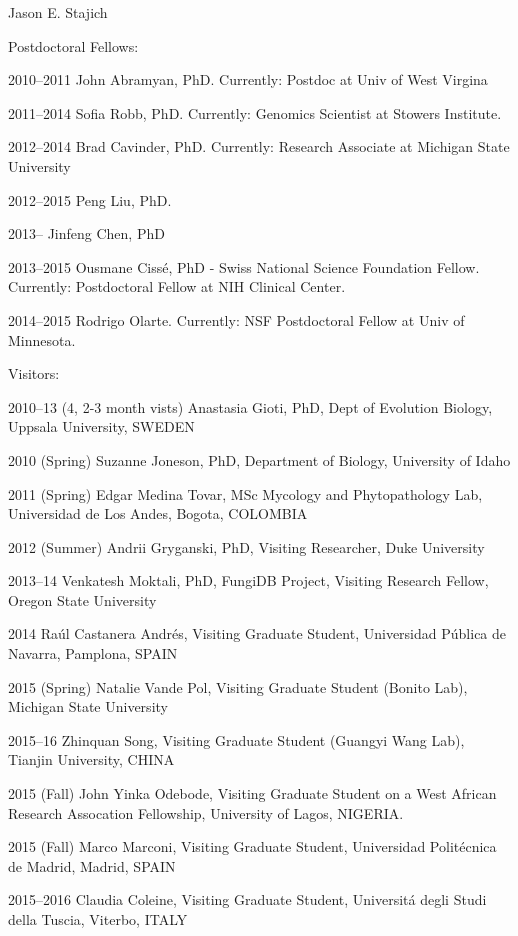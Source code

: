 \documentclass[10pt]{article}
\begin{document}
\begin{cv}{\centerline{Jason E. Stajich}}
\begin{cvlistcompact}{Postdoctoral Fellows:}
\item [2010--2011] John Abramyan, PhD. Currently: Postdoc at Univ of West
  Virgina
\item [2011--2014] Sofia Robb, PhD. Currently: Genomics Scientist at
  Stowers Institute.
\item [2012--2014] Brad Cavinder, PhD. Currently: Research Associate at Michigan
  State University
\item [2012--2015] Peng Liu, PhD. 
\item [2013--] Jinfeng Chen, PhD
\item [2013--2015] Ousmane Ciss\'{e}, PhD - Swiss National Science
  Foundation Fellow. Currently: Postdoctoral Fellow at NIH Clinical Center.
\item [2014--2015] Rodrigo Olarte. Currently: NSF Postdoctoral Fellow
  at Univ of Minnesota.
\end{cvlistcompact}

\begin{cvlistcompact}{Visitors:}
\item [2010--13 (4, 2-3 month vists)] Anastasia Gioti, PhD,
  Dept of Evolution Biology, Uppsala University, SWEDEN
\item [2010 (Spring)] Suzanne Joneson, PhD, Department of Biology, University of Idaho
\item [2011 (Spring)] Edgar Medina Tovar, MSc
  Mycology and Phytopathology Lab, Universidad de Los Andes, Bogota, COLOMBIA
\item [2012 (Summer)] Andrii Gryganski, PhD, Visiting Researcher, Duke University 
\item [2013--14] Venkatesh Moktali, PhD,
  FungiDB Project, Visiting Research Fellow, Oregon State University
\item [2014] Ra\'{u}l Castanera Andr\'{e}s, Visiting Graduate Student,
  Universidad P\'{u}blica de Navarra, Pamplona, SPAIN
\item [2015 (Spring)] Natalie Vande Pol, Visiting Graduate Student (Bonito Lab), Michigan State University
\item [2015--16] Zhinquan Song, Visiting Graduate Student (Guangyi
  Wang Lab), Tianjin University, CHINA
\item [2015 (Fall)] John Yinka Odebode, Visiting Graduate Student on a West
  African Research Assocation Fellowship, University of Lagos, NIGERIA.
\item [2015 (Fall)] Marco Marconi, Visiting Graduate Student,
    Universidad Polit\'{e}cnica de Madrid, Madrid, SPAIN
\item [2015--2016] Claudia Coleine, Visiting Graduate Student,
    Universit\'{a} degli Studi della Tuscia, Viterbo, ITALY
\end{cvlistcompact}


\end{cv}
\end{document}

